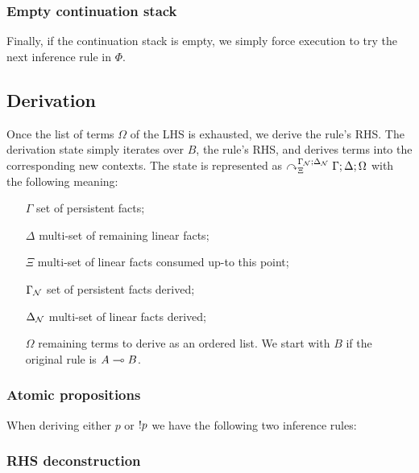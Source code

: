 

\subsubsection{Empty continuation stack}

Finally, if the continuation stack is empty, we simply force execution to try
the next inference rule in $\Phi$.



\subsection{Derivation}

Once the list of terms $\Omega$ of the LHS is exhausted, we derive the rule's
RHS. The derivation state simply iterates over $B$, the rule's RHS, and derives
terms into the corresponding new contexts. The state is represented as
$\curvearrowright_{\Xi}^{\Gamma_{\mathcal{N}}; \Delta_{\mathcal{N}}} \Gamma; \Delta; \Omega$ with the following
meaning:

\begin{enumerate}
   \item[$\Gamma$] set of persistent facts;

   \item[$\Delta$] multi-set of remaining linear facts;

   \item[$\Xi$] multi-set of linear facts consumed up-to this point;

   \item[$\Gamma_{\mathcal{N}}$] set of persistent facts derived;

   \item[$\Delta_{\mathcal{N}}$] multi-set of linear facts derived;

   \item[$\Omega$] remaining terms to derive as an ordered list. We start with
   $B$ if the original rule is $A \multimap B$.

\end{enumerate}

\subsubsection{Atomic propositions}

When deriving either $p$ or ${!} p$ we have the following two inference rules:



\subsubsection{RHS deconstruction}

